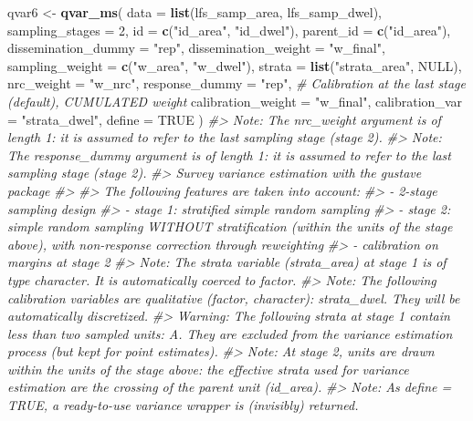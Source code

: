 \documentclass[
]{article}
\newenvironment{Shaded}{\begin{snugshade}}{\end{snugshade}}
\newcommand{\AttributeTok}[1]{\textcolor[rgb]{0.13,0.29,0.53}{#1}}
\newcommand{\CommentTok}[1]{\textcolor[rgb]{0.56,0.35,0.01}{\textit{#1}}}
\newcommand{\ConstantTok}[1]{\textcolor[rgb]{0.56,0.35,0.01}{#1}}
\newcommand{\DecValTok}[1]{\textcolor[rgb]{0.00,0.00,0.81}{#1}}
\newcommand{\FunctionTok}[1]{\textcolor[rgb]{0.13,0.29,0.53}{\textbf{#1}}}
\newcommand{\NormalTok}[1]{#1}
\newcommand{\OtherTok}[1]{\textcolor[rgb]{0.56,0.35,0.01}{#1}}
\newcommand{\StringTok}[1]{\textcolor[rgb]{0.31,0.60,0.02}{#1}}
\begin{document}
\begin{Shaded}
\begin{Highlighting}[]
\NormalTok{qvar6 }\OtherTok{\textless{}{-}} \FunctionTok{qvar\_ms}\NormalTok{(}
  \AttributeTok{data =} \FunctionTok{list}\NormalTok{(lfs\_samp\_area, lfs\_samp\_dwel),}
  \AttributeTok{sampling\_stages =} \DecValTok{2}\NormalTok{,}
  \AttributeTok{id =} \FunctionTok{c}\NormalTok{(}\StringTok{"id\_area"}\NormalTok{, }\StringTok{"id\_dwel"}\NormalTok{),}
  \AttributeTok{parent\_id =} \FunctionTok{c}\NormalTok{(}\StringTok{"id\_area"}\NormalTok{),}
  \AttributeTok{dissemination\_dummy =} \StringTok{"rep"}\NormalTok{,}
  \AttributeTok{dissemination\_weight =} \StringTok{"w\_final"}\NormalTok{,}
  \AttributeTok{sampling\_weight =} \FunctionTok{c}\NormalTok{(}\StringTok{"w\_area"}\NormalTok{, }\StringTok{"w\_dwel"}\NormalTok{),}
  \AttributeTok{strata =} \FunctionTok{list}\NormalTok{(}\StringTok{"strata\_area"}\NormalTok{, }\ConstantTok{NULL}\NormalTok{),}
  \AttributeTok{nrc\_weight =} \StringTok{"w\_nrc"}\NormalTok{,}
  \AttributeTok{response\_dummy =} \StringTok{"rep"}\NormalTok{,}
  \CommentTok{\# Calibration at the last stage (default), CUMULATED weight}
  \AttributeTok{calibration\_weight =} \StringTok{"w\_final"}\NormalTok{,}
  \AttributeTok{calibration\_var =} \StringTok{"strata\_dwel"}\NormalTok{,}
  \AttributeTok{define =} \ConstantTok{TRUE}
\NormalTok{)}
\CommentTok{\#\textgreater{} Note: The nrc\_weight argument is of length 1: it is assumed to refer to the last sampling stage (stage 2).}
\CommentTok{\#\textgreater{} Note: The response\_dummy argument is of length 1: it is assumed to refer to the last sampling stage (stage 2).}
\CommentTok{\#\textgreater{} Survey variance estimation with the gustave package}
\CommentTok{\#\textgreater{} }
\CommentTok{\#\textgreater{} The following features are taken into account:}
\CommentTok{\#\textgreater{}   {-} 2{-}stage sampling design}
\CommentTok{\#\textgreater{}   {-} stage 1: stratified simple random sampling}
\CommentTok{\#\textgreater{}   {-} stage 2: simple random sampling WITHOUT stratification (within the units of the stage above), with non{-}response correction through reweighting}
\CommentTok{\#\textgreater{}   {-} calibration on margins at stage 2}
\CommentTok{\#\textgreater{} Note: The strata variable (strata\_area) at stage 1 is of type character. It is automatically coerced to factor.}
\CommentTok{\#\textgreater{} Note: The following calibration variables are qualitative (factor, character): strata\_dwel. They will be automatically discretized.}
\CommentTok{\#\textgreater{} Warning: The following strata at stage 1 contain less than two sampled units: A. They are excluded from the variance estimation process (but kept for point estimates).}
\CommentTok{\#\textgreater{} Note: At stage 2, units are drawn within the units of the stage above: the effective strata used for variance estimation are the crossing of the parent unit (id\_area).}
\CommentTok{\#\textgreater{} Note: As define = TRUE, a ready{-}to{-}use variance wrapper is (invisibly) returned.}
\end{Highlighting}
\end{Shaded}
\end{document}
